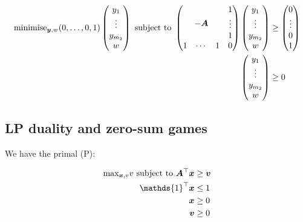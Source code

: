 \begin{equation}
	\begin{split}
		\text{minimise}_{\vect{y},w}
		(0,\ldots,0,1) \begin{pmatrix}
			y_1 \\
			\vdots \\
			y_{m_2} \\
			w
		\end{pmatrix}
		\text{ subject to }
		\begin{pmatrix}
			& & & 1 \\
			& & & \vdots  \\
			\multicolumn{3}{c}
			{\raisebox{\dimexpr\normalbaselineskip+.7\ht\strutbox-.5\height}[0pt][0pt]
			{{$-\vect{A}$}}} & 1 \\
			1 & \cdots & 1 & 0
		\end{pmatrix} \begin{pmatrix}
			y_1 \\
			\vdots \\
			y_{m_2} \\
			w
		\end{pmatrix} & \ge \begin{pmatrix}
			0 \\
			\vdots \\
			0 \\
			1
		\end{pmatrix} \\
		\begin{pmatrix}
			y_1 \\
			\vdots \\
			y_{m_2} \\
			w
		\end{pmatrix} & \ge 0
	\end{split} 
\end{equation}

\subsection{LP duality and zero-sum games}

We have the primal (P):

\begin{equation}
	\begin{split}
		\text{max}_{\vect{x}, v} v \text{ subject to }
		\vect{A}^\top \vect{x} & \ge \vect{v} \\
		\mathds{1}^\top \vect{x} & \le 1 \\
		\vect{x} & \ge 0 \\
		\vect{v} & \ge 0
	\end{split}
\end{equation}

